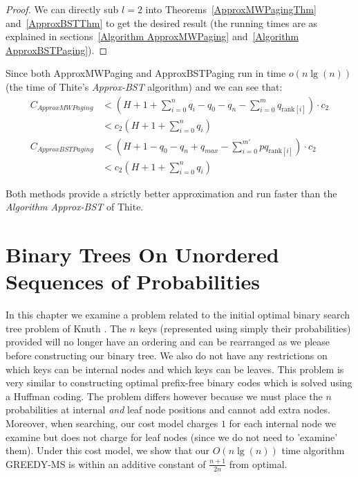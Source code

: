 \documentclass[letterpaper,12pt,titlepage,oneside,final]{book}
\theoremstyle{plain}
\begin{document}
\begin{proof}
We can directly sub $l=2$ into Theorems~\ref{ApproxMWPagingThm} and~\ref{ApproxBSTThm} to get the desired result (the running times are as explained in sections~\ref{Algorithm ApproxMWPaging} and~\ref{Algorithm ApproxBSTPaging}).
\end{proof}

Since both ApproxMWPaging and ApproxBSTPaging run in time $o(n\lg(n))$ (the time of Thite's \textit{Approx-BST} algorithm) and we can see that:\\
\begin{align*}
C_{ApproxMWPaging} &< (H + 1 + \sum_{i=0}^n q_i - q_0 - q_n - \sum_{i=0}^m q_{\text{rank}[i]}) \cdot  c_2 \\
&< c_2(H+1+\sum_{i=0}^{n}q_i) \\
 C_{ApproxBSTPaging} &< (H + 1 - q_0 - q_n + q_{max} - \sum_{i=0}^{m'} pq_{\text{rank}[i]})\cdot c_2 \\
 &< c_2(H+1+\sum_{i=0}^{n}q_i)
 \end{align*}

Both methods provide a strictly better approximation and run faster than the \textit{Algorithm Approx-BST} of Thite.

\chapter{Binary Trees On Unordered Sequences of Probabilities}\label{BST over Multisets}

In this chapter we examine a problem related to the initial optimal binary search tree problem of Knuth \cite{knuth1971optimum}. The $n$ keys (represented using simply their probabilities) provided will no longer have an ordering and can be rearranged as we please before constructing our binary tree. We also do not have any restrictions on which keys can be internal nodes and which keys can be leaves. This problem is very similar to constructing optimal prefix-free binary codes which is solved using a Huffman coding. The problem differs however because we must place the $n$ probabilities at internal \textit{and} leaf node positions and cannot add extra nodes. Moreover, when searching, our cost model charges $1$ for each internal node we examine but does not charge for leaf nodes (since we do not need to 'examine' them). Under this cost model, we show that our $O(n \lg(n))$ time algorithm GREEDY-MS is within an additive constant of $\frac{n+1}{2n}$ from optimal.
\end{document}
